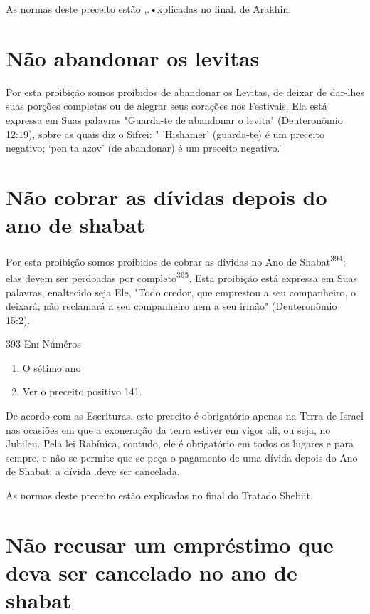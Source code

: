 As normas deste preceito estão ,.•xplicadas no final. de Arakhin.

\section{Não abandonar os levitas}

Por esta proibição somos proibidos de abandonar os Levitas, de dei­xar
de dar-lhes suas porções completas ou de alegrar seus corações nos
Festi­vais. Ela está expressa em Suas palavras "Guarda-te de abandonar o
levita" (Deu­teronômio 12:19), sobre as quais diz o Sifrei: " 'Hishamer'
(guarda-te) é um pre­ceito negativo; `pen ta azov' (de abandonar) é um
preceito negativo.'

\section{Não cobrar as dívidas depois do ano de shabat}

Por esta proibição somos proibidos de cobrar as dívidas no Ano de
Shabat\textsuperscript{394}; elas devem ser perdoadas por
completo\textsuperscript{395}. Esta proibição está ex­pressa em Suas
palavras, enaltecido seja Ele, "Todo credor, que emprestou a seu
companheiro, o deixará; não reclamará a seu companheiro nem a seu
ir­mão" (Deuteronômio 15:2).

393 Em Núméros


\begin{enumerate}
\def\labelenumi{\arabic{enumi}.}
\setcounter{enumi}{393}
\item
 
 O sétimo ano
 
\item
 
 Ver o preceito positivo 141.
 
\end{enumerate}


De acordo com as Escrituras, este preceito é obrigatório apenas na Terra
de Israel nas ocasiões em que a exoneração da terra estiver em vigor
ali, ou seja, no Jubileu. Pela lei Rabínica, contudo, ele é obrigatório
em todos os lugares e para sempre, e não se permite que se peça o
pagamento de uma dívi­da depois do Ano de Shabat: a dívida .deve ser
cancelada.


As normas deste preceito estão explicadas no final do Tratado Shebiit.


\section{Não recusar um empréstimo que deva ser cancelado no ano de shabat}

